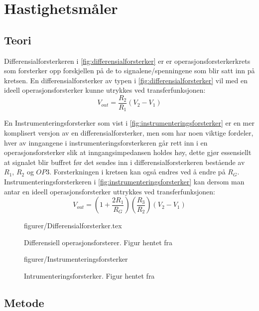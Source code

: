 \section{Hastighetsmåler}
\subsection{Teori}
Differensialforsterkeren i \autoref{fig:differensialforsterker} er er operasjonsforsterkerkrets som forsterker opp forskjellen på de to signalene/spenningene som blir satt inn på kretsen. En differensialforsterker av typen i \autoref{fig:differensialforsterker} vil med en ideell operasjonsforsterker kunne utrykkes ved transferfunksjonen\cite{Johnson}:
\begin{equation}
    V_{out} = \frac{R_2}{R_1}(V_2-V_1)
    \label{eq:differensialforsterker}
\end{equation}

En Instrumenteringsforsterker som vist i \autoref{fig:instrumenteringsforsterker} er en mer komplisert versjon av en differensialforsterker, men som har noen viktige fordeler, hver av inngangene i instrumenteringsforsterkeren går rett inn i en operasjonsforsterker slik at inngangsimpedansen holdes høy, dette gjør essensiellt at signalet blir buffret før det sendes inn i differensialforsterkeren bestående av $R_1$, $R_2$ og $OP3$. Forsterkningen i kretsen kan også endres ved å endre på $R_G$. Instrumenteringsforsterkeren i \autoref{fig:instrumenteringsforsterker} kan dersom man antar en ideell operasjonsforsterker uttrykkes ved transferfunksjonen:
\begin{equation}
    V_{out} = (1+\frac{2R_1}{R_G})(\frac{R_3}{R_2})(V_2-V_1)
    \label{eq:instrumenteringsforsterker}
\end{equation}


\begin{figure} [h]
     {figurer/Differensialforsterker.tex}
    \caption{Differensiell operasjonsforsterer. Figur hentet fra \cite{Johnson}}
    \label{fig:differensialforsterker}
\end{figure}


\begin{figure} [h]
    \centering
     {figurer/Instrumenteringsforsterker}
    \caption{Intrumenteringsforsterker. Figur hentet fra \cite{Johnson}}
    \label{fig:instrumenteringsforsterker}
\end{figure}



\subsection{Metode}


